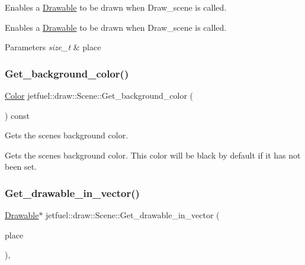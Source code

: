 Enables a \hyperlink{classjetfuel_1_1draw_1_1Drawable}{Drawable} to be drawn when Draw\+\_\+scene is called. 

Enables a \hyperlink{classjetfuel_1_1draw_1_1Drawable}{Drawable} to be drawn when Draw\+\_\+scene is called.


\begin{DoxyParams}{Parameters}
{\em size\+\_\+t} & place \\
\hline
\end{DoxyParams}
\mbox{\label{classjetfuel_1_1draw_1_1Scene_a212ff5b6cb07e2332b92ef72f5d67819}} 
\subsubsection{\texorpdfstring{Get\+\_\+background\+\_\+color()}{Get\_background\_color()}}
{\footnotesize\ttfamily \hyperlink{classjetfuel_1_1draw_1_1Color}{Color} jetfuel\+::draw\+::\+Scene\+::\+Get\+\_\+background\+\_\+color (\begin{DoxyParamCaption}{ }\end{DoxyParamCaption}) const\hspace{0.3cm}{\ttfamily [inline]}}



Gets the scene\textquotesingle{}s background color. 

Gets the scene\textquotesingle{}s background color. This color will be black by default if it has not been set. \mbox{\label{classjetfuel_1_1draw_1_1Scene_ad22707818e9de20b28d82646ca460141}} 
\subsubsection{\texorpdfstring{Get\+\_\+drawable\+\_\+in\+\_\+vector()}{Get\_drawable\_in\_vector()}}
{\footnotesize\ttfamily \hyperlink{classjetfuel_1_1draw_1_1Drawable}{Drawable}$\ast$ jetfuel\+::draw\+::\+Scene\+::\+Get\+\_\+drawable\+\_\+in\+\_\+vector (\begin{DoxyParamCaption}\item[{size\+\_\+t}]{place }\end{DoxyParamCaption})\hspace{0.3cm}{\ttfamily [inline]}, {\ttfamily [protected]}}



